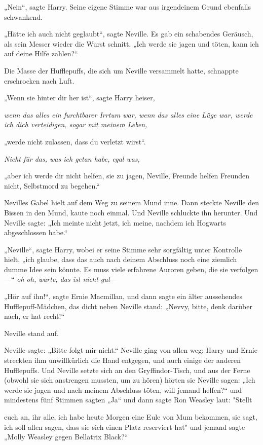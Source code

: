 {„Nein“, sagte Harry. Seine eigene Stimme war aus irgendeinem Grund ebenfalls schwankend.

„Hätte ich auch nicht geglaubt“, sagte Neville. Es gab ein schabendes Geräusch, als sein Messer wieder die Wurst schnitt. „Ich werde sie jagen und töten, kann ich auf deine Hilfe zählen?“

Die Masse der Hufflepuffs, die sich um Neville versammelt hatte, schnappte erschrocken nach Luft.

„Wenn sie hinter dir her ist“, sagte Harry heiser,

\emph{wenn das alles ein furchtbarer Irrtum war, wenn das alles eine Lüge war, werde ich dich verteidigen, sogar mit meinem Leben,}

„werde nicht zulassen, dass du verletzt wirst“.

\emph{Nicht für das, was ich getan habe, egal was,}

„aber ich werde dir nicht helfen, sie zu jagen, Neville, Freunde helfen Freunden nicht, Selbstmord zu begehen.“

Nevilles Gabel hielt auf dem Weg zu seinem Mund inne. Dann steckte Neville den Bissen in den Mund, kaute noch einmal. Und Neville schluckte ihn herunter. Und Neville sagte: „Ich meinte nicht jetzt, ich meine, nachdem ich Hogwarts abgeschlossen habe.“

„Neville“, sagte Harry, wobei er seine Stimme sehr sorgfältig unter Kontrolle hielt, „ich glaube, dass das auch nach deinem Abschluss noch eine ziemlich dumme Idee sein könnte. Es muss viele erfahrene Auroren geben, die sie verfolgen—“ \emph{oh oh,} \emph{warte, das ist nicht gut—}

„Hör auf ihn!“, sagte Ernie Macmillan, und dann sagte ein älter aussehendes Hufflepuff-Mädchen, das dicht neben Neville stand: „Nevvy, bitte, denk darüber nach, er hat recht!“

Neville stand auf.

Neville sagte: „Bitte folgt mir nicht.“ Neville ging von allen weg; Harry und Ernie streckten ihm unwillkürlich die Hand entgegen, und auch einige der anderen Hufflepuffs. Und Neville setzte sich an den Gryffindor-Tisch, und aus der Ferne (obwohl sie sich anstrengen mussten, um zu hören) hörten sie Neville sagen: „Ich werde sie jagen und nach meinem Abschluss töten, will jemand helfen?“ und mindestens fünf Stimmen sagten „Ja“ und dann sagte Ron Weasley laut: "Stellt

euch an, ihr alle, ich habe heute Morgen eine Eule von Mum bekommen, sie sagt, ich soll allen sagen, dass sie sich einen Platz reserviert hat" und jemand sagte „Molly Weasley gegen Bellatrix Black?“

}
